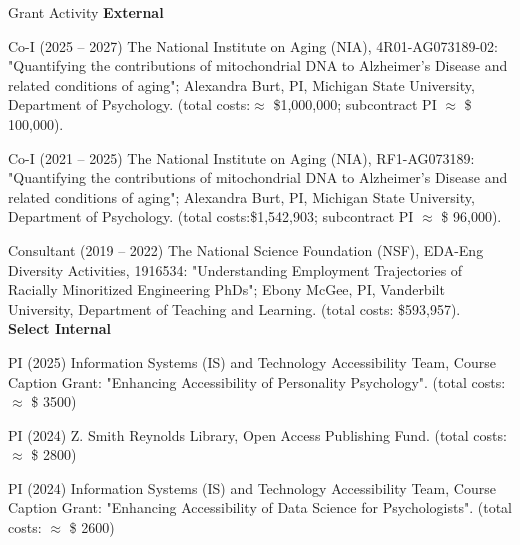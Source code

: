 \begin{rSection}{\textrm{Grant Activity}}%
{\large \textbf{External}}%
\begin{etaremune}
\item Co-I (2025 – 2027) The National Institute on Aging (NIA), 4R01-AG073189-02: "Quantifying the contributions of mitochondrial DNA to Alzheimer's Disease and related conditions of aging"; Alexandra Burt, PI, Michigan State University, Department of Psychology. (total costs:$\approx$ \$1,000,000; subcontract PI $\approx$ \$ 100,000).

\item Co-I (2021 – 2025) The National Institute on Aging (NIA), RF1-AG073189: "Quantifying the contributions of mitochondrial DNA to Alzheimer's Disease and related conditions of aging"; Alexandra Burt, PI, Michigan State University, Department of Psychology. (total costs:\$1,542,903; subcontract PI $\approx$  \$ 96,000).

\item Consultant (2019 – 2022) The National Science Foundation (NSF), EDA-Eng Diversity Activities, 1916534: "Understanding Employment Trajectories of Racially Minoritized Engineering PhDs"; Ebony McGee, PI, Vanderbilt University, Department of Teaching and Learning. (total costs: \$593,957).
\smallskip\\
\hspace*{-8mm}\large{\bf{Select Internal}}%
\item PI (2025) Information Systems (IS) and Technology Accessibility Team, Course Caption Grant: "Enhancing Accessibility of Personality Psychology". (total costs: $\approx$ \$ 3500)%
\item PI (2024) Z. Smith Reynolds Library, Open Access Publishing Fund. (total costs: $\approx$ \$ 2800) %
\item PI (2024) Information Systems (IS) and Technology Accessibility Team, Course Caption Grant: "Enhancing Accessibility of Data Science for Psychologists". (total costs: $\approx$ \$ 2600)%
\end{etaremune}
\end{rSection}